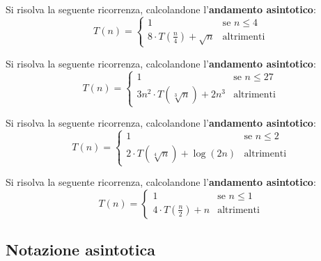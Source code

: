 \begin{exsbox}
	Si risolva la seguente ricorrenza, calcolandone l'\textbf{andamento asintotico}:
	\begin{displaymath}
		T(n) = \begin{cases}
			1 & \text{se } n \leq 4\\
			8 \cdot T(\frac{n}{4}) + \sqrt{n} & \text{altrimenti}
		\end{cases}
	\end{displaymath}
\end{exsbox}

\begin{exsbox}
	Si risolva la seguente ricorrenza, calcolandone l'\textbf{andamento asintotico}:
	\begin{displaymath}
		T(n) = \begin{cases}
			1 & \text{se } n \leq 27\\
			3n^{2} \cdot T(\sqrt[3]{n}) + 2n^{3} & \text{altrimenti}
		\end{cases}
	\end{displaymath}
\end{exsbox}

\begin{exsbox}
	Si risolva la seguente ricorrenza, calcolandone l'\textbf{andamento asintotico}:
	\begin{displaymath}
		T(n) = \begin{cases}
			1 & \text{se } n \leq 2\\
			2 \cdot T(\sqrt[4]{n}) + \log(2n)& \text{altrimenti}
		\end{cases}
	\end{displaymath}
\end{exsbox}

\begin{exsbox}
	Si risolva la seguente ricorrenza, calcolandone l'\textbf{andamento asintotico}:
	\begin{displaymath}
		T(n) = \begin{cases}
			1 & \text{se } n \leq 1\\
			4 \cdot T(\frac{n}{2}) +n & \text{altrimenti}
		\end{cases}
	\end{displaymath}
\end{exsbox}

\subsection{Notazione asintotica}

